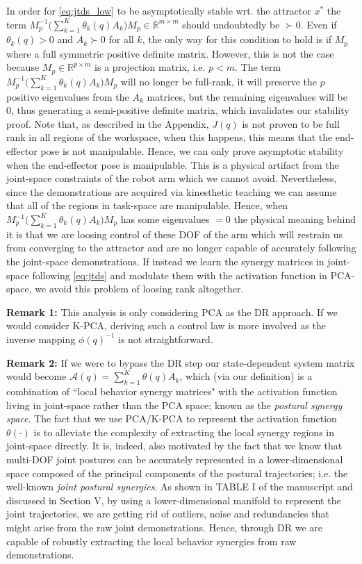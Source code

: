 \documentclass{article}
\begin{document}
In order for \eqref{eq:jtds_low} to be asymptotically stable wrt. the attractor $x^*$ the term $M_p^{-1}\big(\sum_{k=1}^{K}\theta_k(q)A_k\big)M_p \in \mathbb{R}^{m\times m}$ should undoubtedly be $\succ 0$. Even if $\theta_k(q) > 0$ and $A_k \succ 0$ for all $k$, the only way for this condition to hold is if $M_p$ where a full symmetric positive definite matrix. However, this is not the case because $M_p\in \mathbb{R}^{p\times m}$  is a projection matrix, i.e. $p<m$. The term $M_p^{-1}\big(\sum_{k=1}^{K}\theta_k(q)A_k\big)M_p$ will no longer be full-rank, it will preserve the $p$ positive eigenvalues from the $A_k$ matrices, but the remaining eigenvalues will be 0, thus generating a semi-positive definite matrix, which invalidates our stability proof. Note that, as described in the Appendix, $J(q)$ is not proven to be full rank in all regions of the workspace, when this happens, this means that the end-effector pose is not manipulable. Hence, we can only prove asymptotic stability when the end-effector pose is manipulable. This is a physical artifact from the joint-space constraints of the robot arm which we cannot avoid. Nevertheless, since the demonstrations are acquired via kinesthetic teaching we can assume that all of the regions in task-space are manipulable. Hence, when $M_p^{-1}\big(\sum_{k=1}^{K}\theta_k(q)A_k\big)M_p$ has some eigenvalues $=0$ the physical meaning behind it is that we are loosing control of these DOF of the arm which will restrain us from converging to the attractor and are no longer capable of accurately following the joint-space demonstrations. If instead we learn the synergy matrices in joint-space following \eqref{eq:jtds} and modulate them with the activation function in PCA-space, we avoid this problem of loosing rank altogether. 

\noindent \textbf{Remark 1:} This analysis is only considering PCA as the DR approach. If we would consider K-PCA, deriving such a control law is more involved as the inverse mapping $\phi(q)^{-1}$ is not straightforward.

\noindent \textbf{Remark 2:} If we were to bypass the DR step our state-dependent system matrix would become $\mathcal{A}(q)= \sum\limits_{k=1}^{K}\theta(q)A_k$, which (via our definition) is a combination of ``local behavior synergy matrices" with the activation function living in joint-space rather than the PCA space; known as the \textit{postural synergy space}. The fact that we use PCA/K-PCA to represent the activation function $\theta(\cdot)$ is to alleviate the complexity of extracting the local synergy regions in joint-space directly. It is, indeed, also motivated by the fact that we know that multi-DOF joint postures can be accurately represented in a lower-dimensional space composed of the principal components of the postural trajectories; i.e. the well-known \textit{joint postural synergies}. As shown in TABLE I of the manuscript and discussed in Section V, by using a lower-dimensional manifold to represent the joint trajectories, we are getting rid of outliers, noise and redundancies that might arise from the raw joint demonstrations. Hence, through DR we are capable of robustly extracting the local behavior synergies from raw demonstrations. \\
\end{document}
